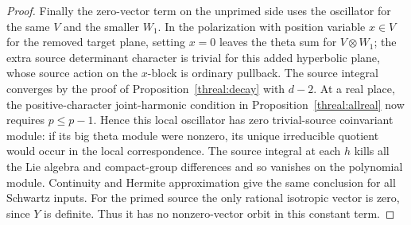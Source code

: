 \begin{proof}
Finally the zero-vector term on the unprimed side uses the
oscillator for the same \(V\) and the smaller \(W_1\). In the
polarization with position variable \(x\in V\) for the removed
target plane, setting \(x=0\) leaves the theta sum for
\(V\otimes W_1\); the extra source determinant character is
trivial for this added hyperbolic plane, whose source action on
the \(x\)-block is ordinary pullback. The source integral converges
by the proof of Proposition~\ref{threal:decay} with \(d-2\).
At a real place, the positive-character joint-harmonic condition in
Proposition~\ref{threal:allreal} now requires \(p\le p-1\).
Hence this local oscillator has zero trivial-source coinvariant
module: if its big theta module were nonzero, its unique irreducible
quotient would occur in the local correspondence. The source
integral at each \(h\) kills all the Lie algebra and compact-group
differences and so vanishes on the polynomial module. Continuity
and Hermite approximation give the same conclusion for all Schwartz
inputs. For the primed source the only rational isotropic vector is
zero, since \(Y\) is definite. Thus it has no nonzero-vector
orbit in this constant term.
\end{proof}

